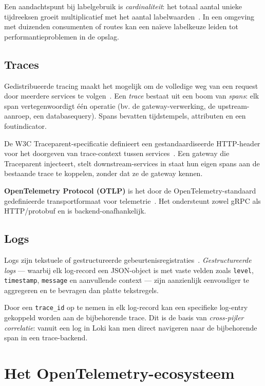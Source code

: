 Een aandachtspunt bij labelgebruik is \textit{cardinaliteit}: het totaal aantal unieke tijdreeksen groeit multiplicatief met het aantal labelwaarden~\autocite{Prometheus2024BestPractices}. In een omgeving met duizenden consumenten of routes kan een naïeve labelkeuze leiden tot performantieproblemen in de opslag.

\subsection{Traces}

Gedistribueerde tracing maakt het mogelijk om de volledige weg van een request door meerdere services te volgen~\autocite{OpenTelemetry2024Traces}. Een \textit{trace} bestaat uit een boom van \textit{spans}: elk span vertegenwoordigt één operatie (bv. de gateway-verwerking, de upstream-aanroep, een databasequery). Spans bevatten tijdstempels, attributen en een foutindicator.

De W3C Traceparent-specificatie definieert een gestandaardiseerde HTTP-header voor het doorgeven van trace-context tussen services~\autocite{W3CTraceContext2021}. Een gateway die Traceparent injecteert, stelt downstream-services in staat hun eigen spans aan de bestaande trace te koppelen, zonder dat ze de gateway kennen.

\textbf{OpenTelemetry Protocol (OTLP)} is het door de OpenTelemetry-standaard gedefinieerde transportformaat voor telemetrie~\autocite{OpenTelemetry2024OTLP}. Het ondersteunt zowel gRPC als HTTP/protobuf en is backend-onafhankelijk.

\subsection{Logs}

Logs zijn tekstuele of gestructureerde gebeurtenisregistraties~\autocite{OpenTelemetry2024Logs}. \textit{Gestructureerde logs} --- waarbij elk log-record een JSON-object is met vaste velden zoals \texttt{level}, \texttt{timestamp}, \texttt{message} en aanvullende context --- zijn aanzienlijk eenvoudiger te aggregeren en te bevragen dan platte tekstregels.

Door een \texttt{trace\_id} op te nemen in elk log-record kan een specifieke log-entry gekoppeld worden aan de bijbehorende trace. Dit is de basis van \textit{cross-pijler correlatie}: vanuit een log in Loki kan men direct navigeren naar de bijbehorende span in een trace-backend.

\section{Het OpenTelemetry-ecosysteem}%
\label{sec:opentelemetry}

